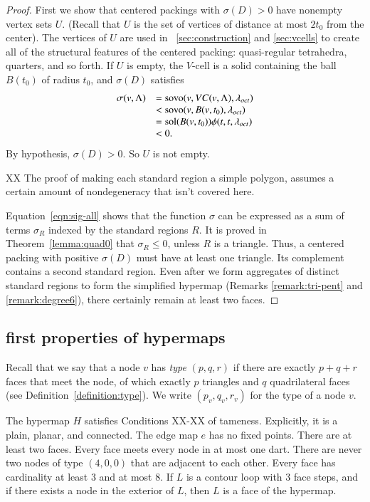 \begin{proof}
First we show that centered packings with $\sigma(D)>0$ have
nonempty vertex sets $U$. (Recall that $U$ is the set of vertices
of distance at most $2t_0$ from the center).  The vertices of $U$
are used in \Chaps~\ref{sec:construction} and \ref{sec:vcells} to
create all of the structural features of the centered packing:
quasi-regular tetrahedra, quarters, and so forth. If $U$ is empty,
the $V$-cell is a solid containing the ball $B(t_0)$ of radius
$t_0$, and $\sigma(D)$ satisfies
    $$
    \begin{array}{lll}
    \sigma(v,\Lambda) &= {\operatorname{sovo}}(v,VC(v,\Lambda),\lambda_{oct})\\
              &< {\operatorname{sovo}}(v,B(v,t_0),\lambda_{oct})\\
              &= \operatorname{sol}(B(v,t_0))\phi(t,t,\lambda_{oct})\\
              &< 0.
    \end{array}
    $$
By hypothesis, $\sigma(D)>0$.  So $U$ is not empty.

XX The proof of making each standard region a simple polygon, assumes a
certain amount of nondegeneracy that isn't covered here.

Equation~\ref{eqn:sig-all} shows that the function $\sigma$ can be
expressed as a sum of terms $\sigma_R$ indexed by the standard
regions $R$. It is proved in Theorem~\ref{lemma:quad0} that
$\sigma_R\le0$, unless $R$ is a triangle. Thus, a centered packing
with positive $\sigma(D)$ must have at least one triangle. Its
complement contains a second standard region. Even after we form
aggregates of distinct standard regions to form the simplified
hypermap (Remarks \ref{remark:tri-pent} and \ref{remark:degree6}),
there certainly remain at least two faces.
\end{proof}


\subsection{first properties of hypermaps}
    \label{sec:startame}


Recall that we say that a node $v$ has {\it type\/} $(p,q,r)$ if
there are exactly $p+q+r$ faces that meet the node, of which exactly
$p$ triangles and $q$ quadrilateral faces (see
Definition~\ref{definition:type}).  We write $(p_v,q_v,r_v)$ for the
type of a node $v$.

\begin{lemma} The hypermap $H$ satisfies Conditions XX-XX of tameness.
Explicitly, it is a plain, planar, and connected. The edge map $e$
has no fixed points. There are at least two faces. Every face meets
every node in at most one dart.  There are never two nodes of type
$(4,0,0)$ that are adjacent to each other.  Every face has
cardinality at least $3$ and at most $8$.  If $L$ is a contour loop
with $3$ face steps, and if there exists a node in the exterior of
$L$, then $L$ is a face of the hypermap.
\end{lemma}


